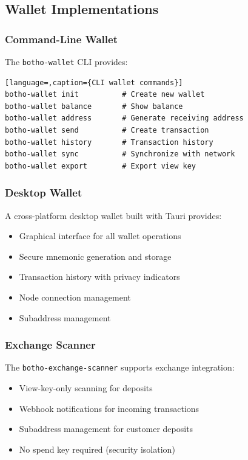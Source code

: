 \subsection{Wallet Implementations}

\subsubsection{Command-Line Wallet}

The \texttt{botho-wallet} CLI provides:

\begin{lstlisting}[language=,caption={CLI wallet commands}]
botho-wallet init          # Create new wallet
botho-wallet balance       # Show balance
botho-wallet address       # Generate receiving address
botho-wallet send          # Create transaction
botho-wallet history       # Transaction history
botho-wallet sync          # Synchronize with network
botho-wallet export        # Export view key
\end{lstlisting}

\subsubsection{Desktop Wallet}

A cross-platform desktop wallet built with Tauri provides:

\begin{itemize}
  \item Graphical interface for all wallet operations
  \item Secure mnemonic generation and storage
  \item Transaction history with privacy indicators
  \item Node connection management
  \item Subaddress management
\end{itemize}

\subsubsection{Exchange Scanner}

The \texttt{botho-exchange-scanner} supports exchange integration:

\begin{itemize}
  \item View-key-only scanning for deposits
  \item Webhook notifications for incoming transactions
  \item Subaddress management for customer deposits
  \item No spend key required (security isolation)
\end{itemize}

